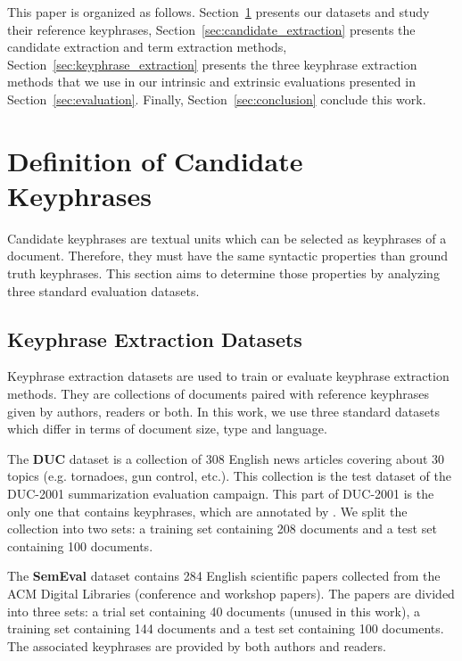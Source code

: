   This paper is organized as follows.
  Section~\ref{sec:definition_of_candidate_keyphrases} presents our datasets and
  study their reference keyphrases, Section~\ref{sec:candidate_extraction}
  presents the candidate extraction and term extraction methods,
  Section~\ref{sec:keyphrase_extraction} presents the three keyphrase extraction
  methods that we use in our intrinsic and extrinsic evaluations presented in
  Section~\ref{sec:evaluation}. Finally, Section~\ref{sec:conclusion} conclude
  this work.

\section{Definition of Candidate Keyphrases}
\label{sec:definition_of_candidate_keyphrases}
  Candidate keyphrases are textual units which can be selected as keyphrases
  of a document. Therefore, they must have the same syntactic properties than
  ground truth keyphrases. This section aims to determine those properties by
  analyzing three standard evaluation datasets.

  \subsection{Keyphrase Extraction Datasets}
  \label{subsec:keyphrase_extraction_datasets}
    Keyphrase extraction datasets are used to train or evaluate keyphrase
    extraction methods. They are collections of documents paired with reference
    keyphrases given by authors, readers or both. In this work, we use three
    standard datasets which differ in terms of document size,  type and
    language.

    The \textbf{DUC} dataset \cite{over2001duc} is a collection of 308 English
    news articles covering about 30 topics (e.g. tornadoes, gun control, etc.).
    This collection is the test dataset of the DUC-2001 summarization evaluation
    campaign. This part of DUC-2001 is the only one that contains keyphrases,
    which are annotated by . We split the collection
    into two sets: a training set containing 208 documents and a test set
    containing 100 documents.

    The \textbf{SemEval} dataset \cite{kim2010semeval} contains 284 English
    scientific papers collected from the ACM Digital Libraries (conference and
    workshop papers). The papers are divided into three sets: a trial set
    containing 40 documents (unused in this work), a training set containing 144
    documents and a test set containing 100 documents. The associated keyphrases
    are provided by both authors and readers.

